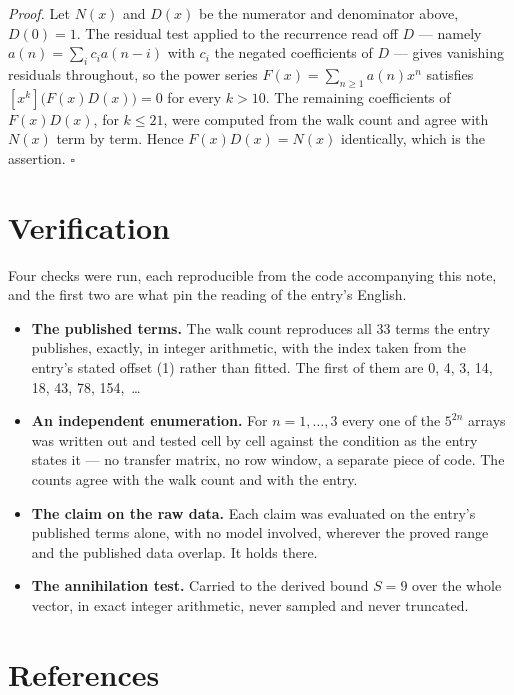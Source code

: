 \documentclass[11pt]{article}
\theoremstyle{definition}
\begin{document}
{\itshape Proof.} Let $N(x)$ and $D(x)$ be the numerator and denominator above, $D(0)=1$. The residual test applied to the recurrence read off $D$ --- namely $a(n) = \sum_i c_i a(n-i)$ with $c_i$ the negated coefficients of $D$ --- gives vanishing residuals throughout, so the power series $F(x)=\sum_{n\ge 1}a(n)x^n$ satisfies $[x^k]\bigl(F(x)D(x)\bigr) = 0$ for every $k > 10$. The remaining coefficients of $F(x)D(x)$, for $k \le 21$, were computed from the walk count and agree with $N(x)$ term by term. Hence $F(x)D(x) = N(x)$ identically, which is the assertion. $\square$

\section{Verification}

Four checks were run, each reproducible from the code accompanying this note, and the first two are what pin the reading of the entry's English.

\begin{itemize}

\item {\bfseries The published terms.} The walk count reproduces all 33 terms the entry publishes, exactly, in integer arithmetic, with the index taken from the entry's stated offset (1) rather than fitted. The first of them are 0, 4, 3, 14, 18, 43, 78, 154,~\dots

\item {\bfseries An independent enumeration.} For $n = 1,\dots,3$ every one of the $5^{2n}$ arrays was written out and tested cell by cell against the condition as the entry states it --- no transfer matrix, no row window, a separate piece of code. The counts agree with the walk count and with the entry.

\item {\bfseries The claim on the raw data.} Each claim was evaluated on the entry's published terms alone, with no model involved, wherever the proved range and the published data overlap. It holds there.

\item {\bfseries The annihilation test.} Carried to the derived bound $S = 9$ over the whole vector, in exact integer arithmetic, never sampled and never truncated.

\end{itemize}

\section{References}
\end{document}

